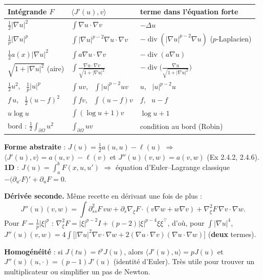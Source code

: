 \documentclass[10pt,a4paper]{article}
\newcommand{\sca}[2]{\langle #1,#2\rangle}
\renewcommand{\div}{\operatorname{div}}
\newcommand{\T}{^{\top}}
\begin{document}
\begin{center}
\renewcommand{\arraystretch}{1.35}
\begin{tabular}{@{}lll@{}}
\toprule
\textbf{Intégrande $F$} & \textbf{$\sca{J'(u)}v$} & \textbf{terme dans l'équation forte}\\\midrule
$\frac12|\nabla u|^2$ & $\int\nabla u\cdot\nabla v$ & $-\Delta u$\\
$\frac1p|\nabla u|^p$ & $\int|\nabla u|^{p-2}\nabla u\cdot\nabla v$ & $-\div(|\nabla u|^{p-2}\nabla u)$ ($p$-Laplacien)\\
$\frac12a(x)|\nabla u|^2$ & $\int a\nabla u\cdot\nabla v$ & $-\div(a\nabla u)$\\
$\sqrt{1+|\nabla u|^2}$ (aire) & $\int\frac{\nabla u\cdot\nabla v}{\sqrt{1+|\nabla u|^2}}$ & $-\div\Big(\frac{\nabla u}{\sqrt{1+|\nabla u|^2}}\Big)$\\
$\frac12u^2$, \ $\frac1p|u|^p$ & $\int uv$, \ $\int|u|^{p-2}uv$ & $u$, \ $|u|^{p-2}u$\\
$f\,u$, \ $\frac12(u-f)^2$ & $\int fv$, \ $\int(u-f)v$ & $f$, \ $u-f$\\
$u\log u$ & $\int(\log u+1)v$ & $\log u+1$\\
bord : $\frac12\int_{\partial\Omega}u^2$ & $\int_{\partial\Omega}uv$ & condition au bord (Robin)\\
\bottomrule
\end{tabular}
\end{center}
\textbf{Forme abstraite} : $J(u)=\frac12a(u,u)-\ell(u)$ $\Rightarrow$ $\sca{J'(u)}v=a(u,v)-\ell(v)$ et $J''(u)(v,w)=a(v,w)$ (Ex 2.4.2, 2.4.6).\\
\textbf{1D} : $J(u)=\int_a^bF(x,u,u')$ $\Rightarrow$ équation d'Euler--Lagrange classique $-\big(\partial_{u'}F\big)'+\partial_uF=0$.

\textbf{Dérivée seconde.} Même recette en dérivant une fois de plus :
\[J''(u)(v,w)=\int\partial^2_{ss}F\,vw+\partial_s\nabla_\xi F\cdot(v\nabla w+w\nabla v)+\nabla^2_\xi F\,\nabla v\cdot\nabla w .\]
Pour $F=\frac1p|\xi|^p$ : $\nabla^2_\xi F=|\xi|^{p-2}I+(p-2)|\xi|^{p-4}\xi\xi\T$, d'où, pour $\int|\nabla u|^4$,
$J''(u)(v,w)=4\int\big[|\nabla u|^2\nabla v\cdot\nabla w+2(\nabla u\cdot\nabla v)(\nabla u\cdot\nabla w)\big]$ (\textbf{deux} termes).

\textbf{Homogénéité} : si $J(tu)=t^pJ(u)$, alors $\sca{J'(u)}u=pJ(u)$ et $J''(u)(u,\cdot)=(p-1)J'(u)$ (identité d'Euler). Très utile pour trouver un multiplicateur ou simplifier un pas de Newton.
\end{document}
